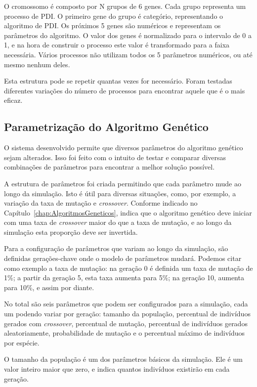 \documentclass[12pt,oneside,a4paper,english,french,spanish,brazil,]{abntex2}
\begin{document}
O cromossomo é composto por N grupos de 6 genes. Cada grupo representa um processo de PDI. O primeiro gene do grupo é categório, representando o algoritmo de PDI. Os próximos 5 genes são numéricos e representam os parâmetros do algoritmo. O valor dos genes é normalizado para o intervalo de 0 a 1, e na hora de construir o processo este valor é transformado para a faixa necessária. Vários processos não utilizam todos os 5 parâmetros numéricos, ou até mesmo nenhum deles.

Esta estrutura pode se repetir quantas vezes for necessário. Foram testadas diferentes variações do número de processos para encontrar aquele que é o mais eficaz.

\subsection{Parametrização do Algoritmo Genético}

O sistema desenvolvido permite que diversos parâmetros do algoritmo genético sejam alterados. Isso foi feito com o intuito de testar e comparar diversas combinações de parâmetros para encontrar a melhor solução possível.

A estrutura de parâmetros foi criada permitindo que cada parâmetro mude ao longo da simulação. Isto é útil para diversas situações, como, por exemplo, a variação da taxa de mutação e \textit{crossover}. Conforme indicado no Capítulo~\ref{chap:AlgoritmosGeneticos}, \citet{linden:2008} indica que o algoritmo genético deve iniciar com uma taxa de \textit{crossover} maior do que a taxa de mutação, e ao longo da simulação esta proporção deve ser invertida.

Para a configuração de parâmetros que variam ao longo da simulação, são definidas gerações-chave onde o modelo de parâmetros mudará. Podemos citar como exemplo a taxa de mutação: na geração 0 é definida um taxa de mutação de 1\%; a partir da geração 5, esta taxa aumenta para 5\%; na geração 10, aumenta para 10\%, e assim por diante. 

No total são seis parâmetros que podem ser configurados para a simulação, cada um podendo variar por geração: tamanho da população, percentual de indivíduos gerados com \textit{crossover}, percentual de mutação, percentual de indivíduos gerados aleatoriamente, probabilidade de mutação e o percentual máximo de indivíduos por espécie.

O tamanho da população é um dos parâmetros básicos da simulação. Ele é um valor inteiro maior que zero, e indica quantos indivíduos existirão em cada geração.
\end{document}
